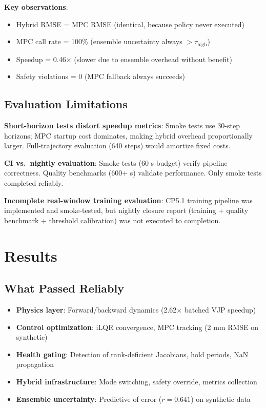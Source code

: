 \documentclass[conference]{IEEEtran}
\begin{document}
\textbf{Key observations}:
\begin{itemize}
\item Hybrid RMSE = MPC RMSE (identical, because policy never executed)
\item MPC call rate = 100\% (ensemble uncertainty always $> \tau_{\text{high}}$)
\item Speedup = 0.46$\times$ (slower due to ensemble overhead without benefit)
\item Safety violations = 0 (MPC fallback always succeeds)
\end{itemize}

\subsection{Evaluation Limitations}

\textbf{Short-horizon tests distort speedup metrics}: Smoke tests use 30-step horizons; MPC startup cost dominates, making hybrid overhead proportionally larger. Full-trajectory evaluation (640 steps) would amortize fixed costs.

\textbf{CI vs.~nightly evaluation}: Smoke tests (60 s budget) verify pipeline correctness. Quality benchmarks (600+ s) validate performance. Only smoke tests completed reliably.

\textbf{Incomplete real-window training evaluation}: CP5.1 training pipeline was implemented and smoke-tested, but nightly closure report (training + quality benchmark + threshold calibration) was not executed to completion.

\section{Results}

\subsection{What Passed Reliably}

\begin{itemize}
\item \textbf{Physics layer}: Forward/backward dynamics (2.62$\times$ batched VJP speedup)
\item \textbf{Control optimization}: iLQR convergence, MPC tracking (2 mm RMSE on synthetic)
\item \textbf{Health gating}: Detection of rank-deficient Jacobians, hold periods, NaN propagation
\item \textbf{Hybrid infrastructure}: Mode switching, safety override, metrics collection
\item \textbf{Ensemble uncertainty}: Predictive of error ($r=0.641$) on synthetic data
\end{itemize}
\end{document}
